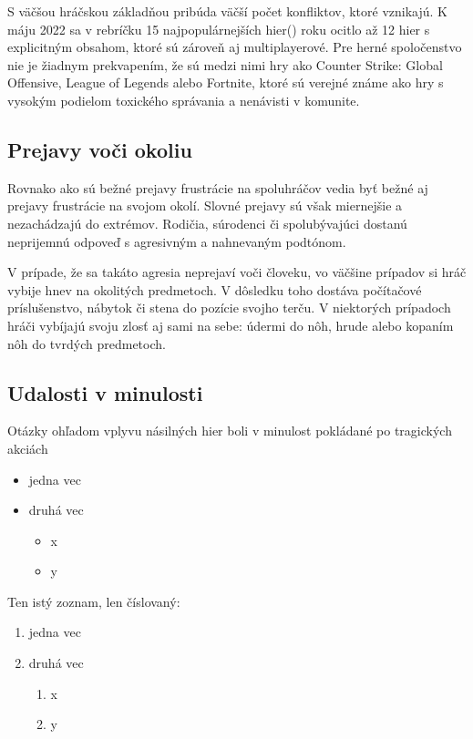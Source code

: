 \documentclass[10pt,twoside,slovak,a4paper]{article}
\begin{document}
S väčšou hráčskou základňou pribúda väčší počet konfliktov, ktoré vznikajú. K máju 2022 sa v rebríčku 15 najpopulárnejších hier(\cite{TopGames}) roku ocitlo až 12 hier s explicitným obsahom, ktoré sú zároveň aj multiplayerové. Pre herné spoločenstvo nie je žiadnym prekvapením, že sú medzi nimi hry ako Counter Strike: Global Offensive, League of Legends alebo Fortnite, ktoré sú verejné známe ako hry s vysokým podielom toxického správania a nenávisti v komunite.

\subsection{Prejavy voči okoliu} \label{ina:okolie}
Rovnako ako sú bežné prejavy frustrácie na spoluhráčov vedia byť bežné aj prejavy frustrácie na svojom okolí. Slovné prejavy sú však miernejšie a nezachádzajú do extrémov. Rodičia, súrodenci či spolubývajúci dostanú neprijemnú odpoveď s agresivným a nahnevaným podtónom. 

V prípade, že sa takáto agresia neprejaví voči človeku, vo väčšine prípadov si hráč vybije hnev na okolitých predmetoch. V dôsledku toho dostáva počítačové príslušenstvo, nábytok či stena do pozície svojho terču. V niektorých prípadoch hráči vybíjajú svoju zlosť aj sami na sebe: údermi do nôh, hrude alebo kopaním nôh do tvrdých predmetoch.

\subsection{Udalosti v minulosti} \label{ina:minulost}
Otázky ohľadom vplyvu násilných hier boli v minulost pokládané po tragických akciách

\begin{itemize}
\item jedna vec
\item druhá vec
	\begin{itemize}
	\item x
	\item y
	\end{itemize}
\end{itemize}

Ten istý zoznam, len číslovaný:

\begin{enumerate}
\item jedna vec
\item druhá vec
	\begin{enumerate}
	\item x
	\item y
	\end{enumerate}
\end{enumerate}
\end{document}
